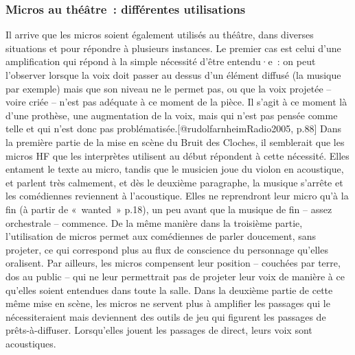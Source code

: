 \documentclass[
]{article}
\begin{document}
\subsubsection{Micros au théâtre~: différentes utilisations}\label{micros-au-thuxe9uxe2tre-diffuxe9rentes-utilisations}

Il arrive que les micros soient également utilisés au théâtre, dans diverses situations et pour répondre à plusieurs instances. Le premier cas est celui d'une amplification qui répond à la simple nécessité d'être entendu·e~: on peut l'observer lorsque la voix doit passer au dessus d'un élément diffusé (la musique par exemple) mais que son niveau ne le permet pas, ou que la voix projetée -- voire criée -- n'est pas adéquate à ce moment de la pièce. Il s'agit à ce moment là d'une prothèse, une augmentation de la voix, mais qui n'est pas pensée comme telle et qui n'est donc pas problématisée.{[}@rudolfarnheimRadio2005, p.88{]} Dans la première partie de la mise en scène du Bruit des Cloches, il semblerait que les micros HF que les interprètes utilisent au début répondent à cette nécessité. Elles entament le texte au micro, tandis que le musicien joue du violon en acoustique, et parlent très calmement, et dès le deuxième paragraphe, la musique s'arrête et les comédiennes reviennent à l'acoustique. Elles ne reprendront leur micro qu'à la fin (à partir de «~wanted~» p.18), un peu avant que la musique de fin -- assez orchestrale -- commence. De la même manière dans la troisième partie, l'utilisation de micros permet aux comédiennes de parler doucement, sans projeter, ce qui correspond plus au flux de conscience du personnage qu'elles oralisent. Par ailleurs, les micros compensent leur position -- couchées par terre, dos au public -- qui ne leur permettrait pas de projeter leur voix de manière à ce qu'elles soient entendues dans toute la salle. Dans la deuxième partie de cette même mise en scène, les micros ne servent plus à amplifier les passages qui le nécessiteraient mais deviennent des outils de jeu qui figurent les passages de prêts-à-diffuser. Lorsqu'elles jouent les passages de direct, leurs voix sont acoustiques.
\end{document}
